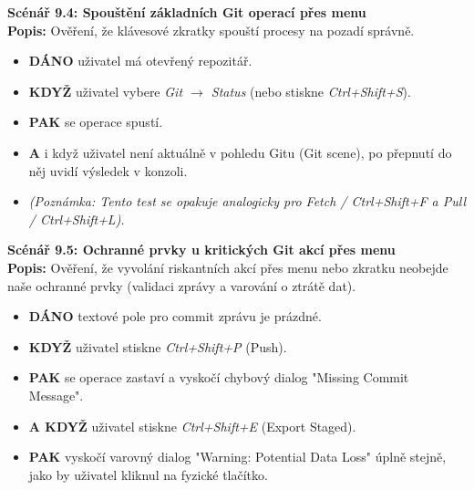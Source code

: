 \documentclass[12pt, a4paper]{article}
\begin{document}
\textbf{Scénář 9.4: Spouštění základních Git operací přes menu} \\
\textbf{Popis:} Ověření, že klávesové zkratky spouští procesy na pozadí správně.
\begin{itemize}
    \item \textbf{DÁNO} uživatel má otevřený repozitář.
    \item \textbf{KDYŽ} uživatel vybere \textit{Git $\rightarrow$ Status} (nebo stiskne \textit{Ctrl+Shift+S}).
    \item \textbf{PAK} se operace spustí.
    \item \textbf{A} i když uživatel není aktuálně v pohledu Gitu (Git scene), po přepnutí do něj uvidí výsledek v konzoli.
    \item \textit{(Poznámka: Tento test se opakuje analogicky pro Fetch / Ctrl+Shift+F a Pull / Ctrl+Shift+L).}
\end{itemize}

\textbf{Scénář 9.5: Ochranné prvky u kritických Git akcí přes menu} \\
\textbf{Popis:} Ověření, že vyvolání riskantních akcí přes menu nebo zkratku neobejde naše ochranné prvky (validaci zprávy a varování o ztrátě dat).
\begin{itemize}
    \item \textbf{DÁNO} textové pole pro commit zprávu je prázdné.
    \item \textbf{KDYŽ} uživatel stiskne \textit{Ctrl+Shift+P} (Push).
    \item \textbf{PAK} se operace zastaví a vyskočí chybový dialog "Missing Commit Message".
    \item \textbf{A KDYŽ} uživatel stiskne \textit{Ctrl+Shift+E} (Export Staged).
    \item \textbf{PAK} vyskočí varovný dialog "Warning: Potential Data Loss" úplně stejně, jako by uživatel kliknul na fyzické tlačítko.
\end{itemize}
\end{document}
